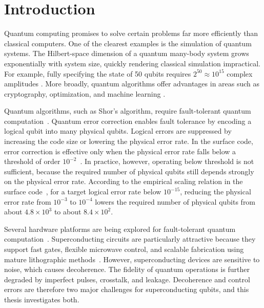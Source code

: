 \chapter{Introduction}
\label{chap:intro}

Quantum computing promises to solve certain problems far more efficiently than classical computers. One of the clearest examples is the simulation of quantum systems. The Hilbert-space dimension of a quantum many-body system grows exponentially with system size, quickly rendering classical simulation impractical. For example, fully specifying the state of 50 qubits requires $2^{50} \approx 10^{15}$ complex amplitudes \cite{Feynman1982,Lloyd1996}. More broadly, quantum algorithms offer advantages in areas such as cryptography, optimization, and machine learning \cite{Dalzell_2025}.

Quantum algorithms, such as Shor's algorithm, require fault-tolerant quantum computation~\cite{shor1997polynomial,shor1996faulttolerant}. Quantum error correction enables fault tolerance by encoding a logical qubit into many physical qubits. Logical errors are suppressed by increasing the code size or lowering the physical error rate. In the surface code, error correction is effective only when the physical error rate falls below a threshold of order $10^{-2}$~\cite{Fowler2012SurfaceCodes,Campbell2017Roads}. In practice, however, operating below threshold is not sufficient, because the required number of physical qubits still depends strongly on the physical error rate. According to the empirical scaling relation in the surface code~\cite{Fowler2012SurfaceCodes}, for a target logical error rate below $10^{-15}$, reducing the physical error rate from $10^{-3}$ to $10^{-4}$ lowers the required number of physical qubits from about $4.8\times10^{3}$ to about $8.4\times10^{2}$.

Several hardware platforms are being explored for fault-tolerant quantum computation~\cite{Monroe2013,Bruzewicz2019,Kok2007,Slussarenko2019,Doherty2013,Pezzagna2021,Saffman2016,Bluvstein2022}. Superconducting circuits are particularly attractive because they support fast gates, flexible microwave control, and scalable fabrication using mature lithographic methods~\cite{Krantz2019,Kjaergaard2020}. However, superconducting devices are sensitive to noise, which causes decoherence. The fidelity of quantum operations is further degraded by imperfect pulses, crosstalk, and leakage. Decoherence and control errors are therefore two major challenges for superconducting qubits, and this thesis investigates both.

